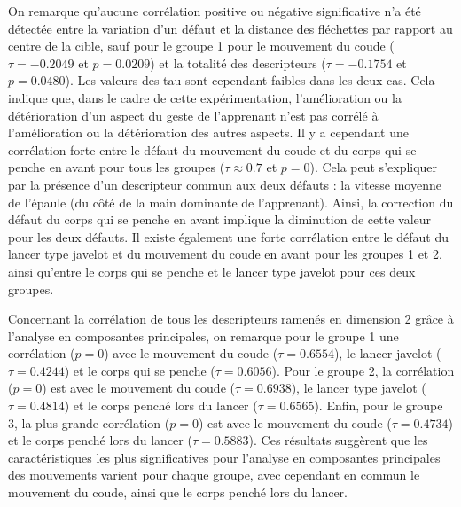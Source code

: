 On remarque qu'aucune corrélation positive ou négative significative n'a été détectée entre la variation d'un défaut et la distance des fléchettes par rapport au centre de la cible, sauf pour le groupe 1 pour le mouvement du coude ($\tau = -0.2049$ et $p = 0.0209$) et la totalité des descripteurs ($\tau = -0.1754$ et $p = 0.0480$). Les valeurs des tau sont cependant faibles dans les deux cas. Cela indique que, dans le cadre de cette expérimentation, l'amélioration ou la détérioration d'un aspect du geste de l'apprenant n'est pas corrélé à l'amélioration ou la détérioration des autres aspects. Il y a cependant une corrélation forte entre le défaut du mouvement du coude et du corps qui se penche en avant pour tous les groupes ($\tau \approx 0.7$ et $p = 0$). Cela peut s'expliquer par la présence d'un descripteur commun aux deux défauts : la vitesse moyenne de l'épaule (du côté de la main dominante de l'apprenant). Ainsi, la correction du défaut du corps qui se penche en avant implique la diminution de cette valeur pour les deux défauts. Il existe également une forte corrélation entre le défaut du lancer type javelot et du mouvement du coude en avant pour les groupes 1 et 2, ainsi qu'entre le corps qui se penche et le lancer type javelot pour ces deux groupes.

Concernant la corrélation de tous les descripteurs ramenés en dimension 2 grâce à l'analyse en composantes principales, on remarque pour le groupe 1 une corrélation ($p = 0$) avec le mouvement du coude ($\tau = 0.6554$), le lancer javelot ($\tau = 0.4244$) et le corps qui se penche ($\tau = 0.6056$). Pour le groupe 2, la corrélation ($p = 0$) est avec le mouvement du coude ($\tau = 0.6938$), le lancer type javelot ($\tau = 0.4814$) et le corps penché lors du lancer ($\tau = 0.6565$). Enfin, pour le groupe 3, la plus grande corrélation ($p = 0$) est avec le mouvement du coude ($\tau = 0.4734$) et le corps penché lors du lancer ($\tau = 0.5883$). Ces résultats suggèrent que les caractéristiques les plus significatives pour l'analyse en composantes principales des mouvements varient pour chaque groupe, avec cependant en commun le mouvement du coude, ainsi que le corps penché lors du lancer. %

